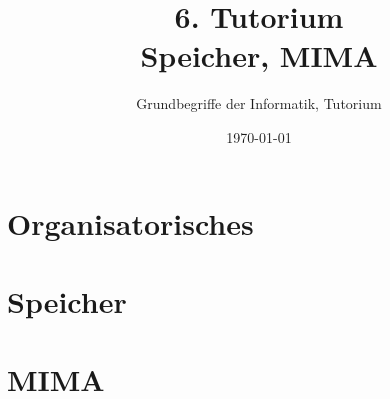 




\title[Speicher, MIMA]{6. Tutorium\\ Speicher, MIMA}
\subtitle{Grundbegriffe der Informatik, Tutorium \hashtag\mytutnumber}
\date{\today}


\titleframe
\roadmap


\section{Organisatorisches}


\section{Speicher}


\section{MIMA}




\section{}
\questionframe
\lastframe
{}
